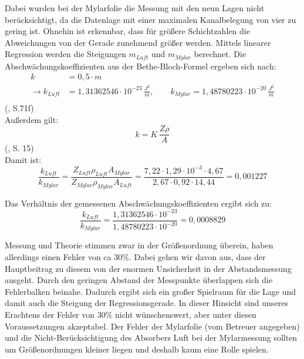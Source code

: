 \clearpage

Dabei wurden bei der Mylarfolie die Messung mit den neun Lagen nicht berücksichtigt, da die Datenlage mit einer maximalen Kanalbelegung 
von vier zu gering ist. Ohnehin ist erkennbar, dass für größere Schichtzahlen die Abweichungen von der Gerade zunehmend größer werden. 
Mittels linearer Regression werden die Steigungen $m_{Luft}$ und $m_{Mylar}$ berechnet. Die Abschwächungskoeffizienten aus der 
Bethe-Bloch-Formel ergeben sich nach: \\

\begin{align}
    k &= 0,5 \cdot m \nonumber \\
    \to k_{Luft} &= 1,31362546 \cdot 10^{-23} \, \frac{J^2}{m}, \qquad k_{Mylar} = 1,48780223 \cdot 10^{-20} \, \frac{J^2}{m} \\
\end{align}
(\cite{Jaekel1997}, S.71f) \\

Außerdem gilt: \\

\begin{equation}
    k = K \, \frac{Z \rho}{A}
\end{equation}
(\cite{Kador2021}, S. 15) \\

Damit ist: \\

\begin{equation}
    \frac{k_{Luft}}{k_{Mylar}} = \frac{Z_{Luft} \rho_{Luft} A_{Mylar}}{Z_{Mylar} \rho_{Mylar} A_{Luft}} = 
    \frac{7,22 \cdot 1,29 \cdot 10^{-3} \cdot 4,67}{2,67 \cdot 0,92 \cdot 14,44} = 0,001227
\end{equation}
 
Das Verhältnis der gemessenen Abschwächungskoeffizienten ergibt sich zu:\\

\begin{equation}
    \frac{k_{Luft}}{k_{Mylar}} = \frac{1,31362546 \cdot 10^{-23}}{1,48780223 \cdot 10^{-20}} = 0,0008829
\end{equation}

Messung und Theorie stimmen zwar in der Größenordnung überein, haben allerdings einen Fehler von ca 30\%. Dabei gehen wir davon aus, 
dass der Hauptbeitrag zu diesem von der enormen Unsicherheit in der Abstandsmessung ausgeht. Durch den geringen Abstand der Messpunkte 
überlappen sich die Fehlerbalken beinahe. Dadurch ergibt sich ein großer Spielraum für die Lage und damit auch die Steigung der 
Regressionsgerade. In dieser Hinsicht sind unseres Erachtens der Fehler von 30\% nicht wünschenswert, aber unter diesen Voraussetzungen 
akzeptabel. Der Fehler der Mylarfolie (vom Betreuer angegeben) und die Nicht-Berücksichtigung des Absorbers Luft bei der Mylarmessung 
sollten um Größenordnungen kleiner liegen und deshalb kaum eine Rolle spielen.






